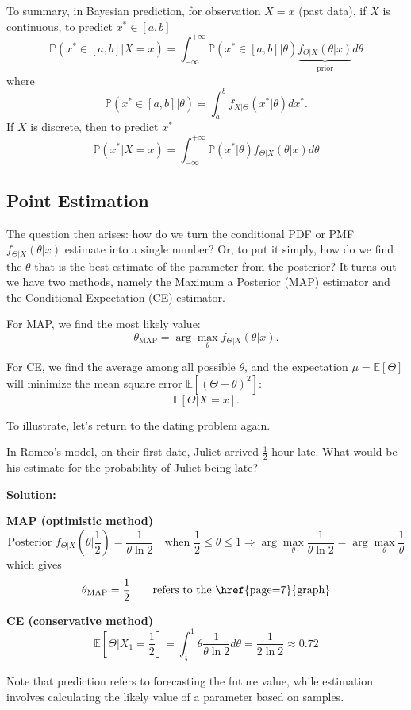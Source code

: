 To summary, in Bayesian prediction, for observation \(X = x\) (past data), if \(X\) is continuous, to predict \(x^* \in [a, b]\) 
\[
  \mathbb{P}(x^* \in [a, b] \vert X = x) = \int_{-\infty}^{+\infty} \mathbb{P}(x^* \in [a, b] \vert \theta) \underbrace{f_{\Theta \vert X} (\theta \vert x)}_{\text{prior}} d \theta
\]
where 
\[
  \mathbb{P}(x^* \in [a, b] \vert \theta) = \int_a^b f_{X \vert \Theta} (x^* \vert \theta) dx^*.
\]
If \(X\) is discrete, then to predict \(x^*\)
\[
  \mathbb{P}(x^* \vert X = x) = \int_{-\infty}^{+\infty} \mathbb{P}(x^* \vert \theta) f_{\Theta \vert X} (\theta \vert x) d \theta 
\] 

\subsection{Point Estimation}
The question then arises: how do we turn the conditional PDF or PMF \(f_{\Theta \vert X} (\theta \vert x)\) estimate into a single number? Or, to put it simply, how do we find the \(\theta\) that is the best estimate of the parameter from the posterior? It turns out we have two methods, namely the Maximum a Posterior (MAP) estimator and the Conditional Expectation (CE) estimator. 

For MAP, we find the most likely value: 
\[
  \theta_{\text{MAP}} = \arg \max_{\theta} f_{\Theta \vert X} (\theta \vert x).
\]

For CE, we find the average among all possible \(\theta\), and the expectation \(\mu = \mathbb{E}[\Theta]\) will minimize the mean square error \(\mathbb{E}[(\Theta - \theta)^2]\): 
\[
  \mathbb{E}[\Theta \vert X = x]. 
\] 

To illustrate, let's return to the dating problem again. 
\begin{eg}
  In Romeo's model, on their first date, Juliet arrived \(\frac{1}{2}\) hour late. What would be his estimate for the probability of Juliet being late?

  \textbf{Solution:} 

  \textbf{MAP (optimistic method)}
  \[
      \text{Posterior } f_{\Theta \vert X} (\theta \vert \frac{1}{2}) = \dfrac{1}{\theta \ln 2}\quad \text{when } \frac{1}{2} \leq \theta \leq 1 \Longrightarrow \arg \max_\theta \dfrac{1}{\theta \ln 2} = \arg \max_\theta \frac{1}{\theta}
  \]
    which gives 
  \[
      \theta_{\text{MAP}} = \frac{1}{2} \quad\quad \text{refers to the \href{page=7}{graph}}
  \]

  \textbf{CE (conservative method)} 
  \[
    \mathbb{E}[\Theta \vert X_1 = \dfrac{1}{2}] = \int_{\frac{1}{2}}^1 \theta \dfrac{1}{\theta \ln 2} d \theta = \dfrac{1}{2\ln 2} \approx0.72
  \]
\end{eg}
\begin{remark}
  Note that prediction refers to forecasting the future value, while estimation involves calculating the likely value of a parameter based on samples.
\end{remark}

